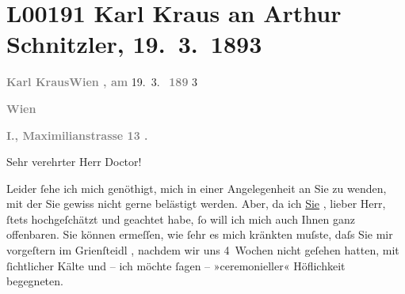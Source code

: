 

\section[Karl Kraus an Arthur Schnitzler, 19. 3. 1893]{L00191 Karl Kraus an Arthur Schnitzler, 19. 3. 1893}
\nopagebreak{}
\rehead{ }\normalsize\beginnumbering{}
\toendnotes[C]{\smallbreak\pagebreak[2]}
\toendnotes[C]{\smallbreak}
\pstart
           {\pb}\textcolor{gray}{\textbf{Karl Kraus}}\hfill \textcolor{gray}{\textbf{Wien
                        , am
                     }}{ }
                        19. 3. 
                        \textcolor{gray}{\textbf{189}}
                        3
                     \pend
           
\pstart
           \textcolor{gray}{\textbf{Wien}}\pend
           
\pstart
           \textcolor{gray}{\textbf{I., Maximilianstrasse 13
                     .
                  }}\pend
           
\pstart{}Sehr verehrter Herr Doctor!\pend\vspace{0.5em}
\pstart
           
               Leider ſehe ich mich genöthigt, mich in einer Angelegenheit an Sie zu wenden, mit der
               Sie gewiss nicht gerne belästigt werden. Aber, da ich 
               \uline{Sie}
               , lieber Herr, ſtets hochgeſchätzt und geachtet habe, ſo will ich 
               \introOben{}mich\introOben{}
                auch Ihnen 
                ganz offenbaren.
               Sie können ermeſſen, wie ſehr es mich kränkten muſste, daſs Sie mir vorgeſtern im 
               Grienſteidl
               , nachdem wir uns 4 Wochen nicht geſehen
               hatten, mit ſichtlicher Kälte und – ich möchte ſagen – »ceremonieller« Höflichkeit
               begegneten.
            \pend
           
